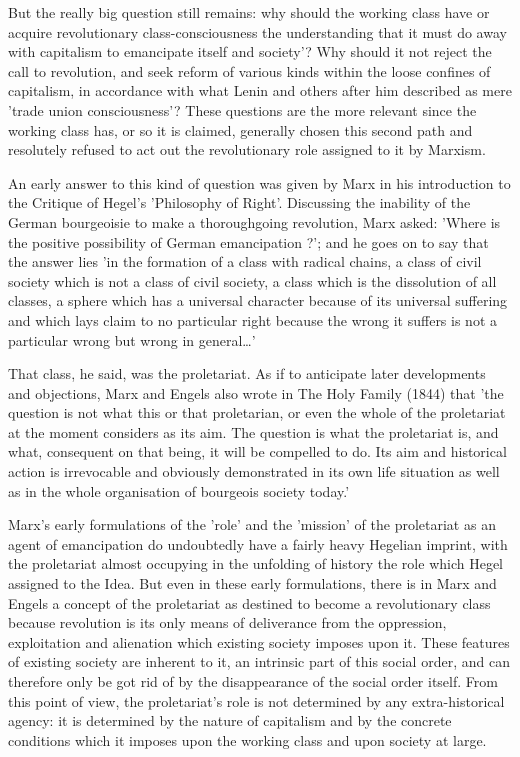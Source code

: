 But the really big question still remains: why should the working class have or acquire revolutionary class-consciousness the understanding that it must do away with capitalism to emancipate itself and society'? Why should it not reject the call to revolution, and seek reform of various kinds within the loose confines of capitalism, in accordance with what Lenin and others after him described as mere 'trade union consciousness'? These questions are the more relevant since the working class has, or so it is claimed, generally chosen this second path and resolutely refused to act out the revolutionary role assigned to it by Marxism.

An early answer to this kind of question was given by Marx in his introduction to the Critique of Hegel's 'Philosophy of Right'. Discussing the inability of the German bourgeoisie to make a thoroughgoing revolution, Marx asked: 'Where is the positive possibility of German emancipation ?'; and he goes on to say that the answer lies 'in the formation of a class with radical chains, a class of civil society which is not a class of civil society, a class which is the dissolution of all classes, a sphere which has a universal character because of its universal suffering and which lays claim to no particular right because the wrong it suffers is not a particular wrong but wrong in general\dots'

That class, he said, was the proletariat. As if to anticipate later developments and objections, Marx and Engels also wrote in The Holy Family (1844) that 'the question is not what this or that proletarian, or even the whole of the proletariat at the moment considers as its aim. The question is what the proletariat is, and what, consequent on that being, it will be compelled to do. Its aim and historical action is irrevocable and obviously demonstrated in its own life situation as well as in the whole organisation of bourgeois society today.'

Marx's early formulations of the 'role' and the 'mission' of the proletariat as an agent of emancipation do undoubtedly have a fairly heavy Hegelian imprint, with the proletariat almost occupying in the unfolding of history the role which Hegel assigned to the Idea. But even in these early formulations, there is in Marx and Engels a concept of the proletariat as destined to become a revolutionary class because revolution is its only means of deliverance from the oppression, exploitation and alienation which existing society imposes upon it. These features of existing society are inherent to it, an intrinsic part of this social order, and can therefore only be got rid of by the disappearance of the social order itself. From this point of view, the proletariat's role is not determined by any extra-historical agency: it is determined by the nature of capitalism and by the concrete conditions which it imposes upon the working class and upon society at large.

